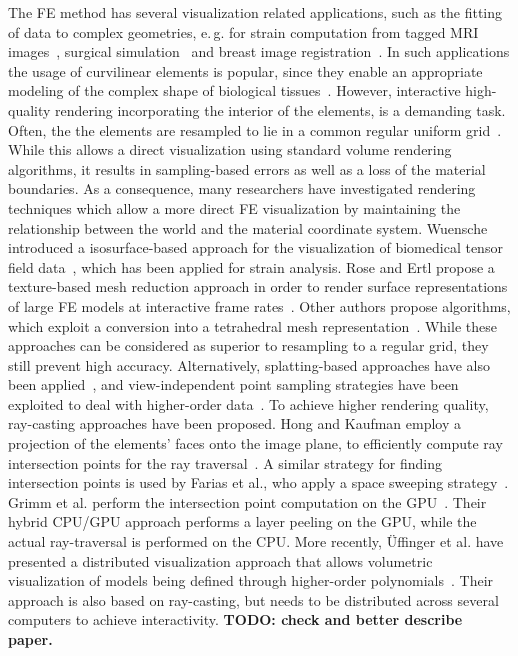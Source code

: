 \documentclass[review,journal]{vgtc}         %
\begin{document}
The FE method has several visualization related applications, such as the fitting of data to complex geometries, e.\,g. for strain computation from tagged MRI images~\cite{Young00}, surgical simulation~\cite{Berkley04} and breast image registration~\cite{lee10deformation}. In such applications the usage of curvilinear elements is popular, since they enable an appropriate modeling of the complex shape of biological tissues~\cite{CURVILINEARELEMENTSAREPOPULAR}. However, interactive high-quality rendering incorporating the interior of the elements, is a demanding task. Often, the the elements are resampled to lie in a common regular uniform grid~\cite{Wihelms90}. While this allows a direct visualization using standard volume rendering algorithms, it results in sampling-based errors as well as a loss of the material boundaries. As a consequence, many researchers have investigated rendering techniques which allow a more direct FE visualization by maintaining the relationship between the world and the material coordinate system. Wuensche introduced a isosurface-based approach for the visualization of biomedical tensor field data~\cite{wunsche03femvis}, which has been applied for strain analysis. Rose and Ertl propose a texture-based mesh reduction approach in order to render surface representations of large FE models at interactive frame rates~\cite{rose03femvis}. Other authors propose algorithms, which exploit a conversion into a tetrahedral mesh representation~\cite{marmitt05femtess,schroeder06femtess}. While these approaches can be considered as superior to resampling to a regular grid, they still prevent high accuracy. Alternatively, splatting-based approaches have also been applied~\cite{mao95femsplatting}, and view-independent point sampling strategies have been exploited to deal with higher-order data~\cite{zhou06pointbased}. To achieve higher rendering quality, ray-casting approaches have been proposed. Hong and Kaufman employ a projection of the elements' faces onto the image plane, to efficiently compute ray intersection points for the ray traversal~\cite{hong99curvilinear}. A similar strategy for finding intersection points is used by Farias et al., who apply a space sweeping strategy~\cite{farias00zsweep}. Grimm et al. perform the intersection point computation on the GPU~\cite{grimm04curvilinear}. Their hybrid CPU/GPU approach performs a layer peeling on the GPU, while the actual ray-traversal is performed on the CPU. More recently, {\"U}ffinger et al. have presented a distributed visualization approach that allows volumetric visualization of models being defined through higher-order polynomials~\cite{uffinger10femraycasting}. Their approach is also based on ray-casting, but needs to be distributed across several computers to achieve interactivity. \textbf{TODO: check and better describe paper.}
\end{document}
